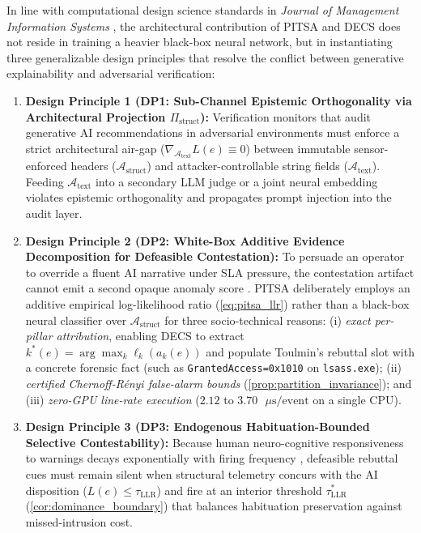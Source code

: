 \documentclass[11pt,a4paper]{article}
\let\oldtexttt\texttt
\renewcommand{\texttt}[1]{\textnormal{\oldtexttt{#1}}}
\begin{document}
In line with computational design science standards in \textit{Journal of Management Information Systems} \citep{ebrahimi2020semi, li2022assessing, ampel2024improving, tutun2024explainable}, the architectural contribution of PITSA and DECS does not reside in training a heavier black-box neural network, but in instantiating three generalizable design principles that resolve the conflict between generative explainability and adversarial verification:
\begin{enumerate}
  \item \textbf{Design Principle 1 (DP1: Sub-Channel Epistemic Orthogonality via Architectural Projection $\Pi_{\text{struct}}$):} Verification monitors that audit generative AI recommendations in adversarial environments must enforce a strict architectural air-gap ($\nabla_{\mathcal{A}_{\text{text}}} L(e) \equiv 0$) between immutable sensor-enforced headers ($\mathcal{A}_{\text{struct}}$) and attacker-controllable string fields ($\mathcal{A}_{\text{text}}$). Feeding $\mathcal{A}_{\text{text}}$ into a secondary LLM judge or a joint neural embedding violates epistemic orthogonality and propagates prompt injection into the audit layer.
  \item \textbf{Design Principle 2 (DP2: White-Box Additive Evidence Decomposition for Defeasible Contestation):} To persuade an operator to override a fluent AI narrative under SLA pressure, the contestation artifact cannot emit a second opaque anomaly score \citep{tutun2024explainable, lebovitz2022engage}. PITSA deliberately employs an additive empirical log-likelihood ratio (\cref{eq:pitsa_llr}) rather than a black-box neural classifier over $\mathcal{A}_{\text{struct}}$ for three socio-technical reasons: (i) \textit{exact per-pillar attribution}, enabling DECS to extract $k^*(e) = \arg\max_k \ell_k(a_k(e))$ and populate Toulmin's rebuttal slot with a concrete forensic fact (such as \texttt{GrantedAccess=0x1010} on \texttt{lsass.exe}); (ii) \textit{certified Chernoff-R\'{e}nyi false-alarm bounds} (\cref{prop:partition_invariance}); and (iii) \textit{zero-GPU line-rate execution} ($2.12$ to $3.70\text{ }\mu\text{s/event}$ on a single CPU).
  \item \textbf{Design Principle 3 (DP3: Endogenous Habituation-Bounded Selective Contestability):} Because human neuro-cognitive responsiveness to warnings decays exponentially with firing frequency \citep{anderson2016warning, vance2018fog, jensen2022improving, bartal2026alert}, defeasible rebuttal cues must remain silent when structural telemetry concurs with the AI disposition ($L(e) \le \tau_{\text{LLR}}$) and fire at an interior threshold $\tau^*_{\text{LLR}}$ (\cref{cor:dominance_boundary}) that balances habituation preservation against missed-intrusion cost.
\end{enumerate}
\end{document}
